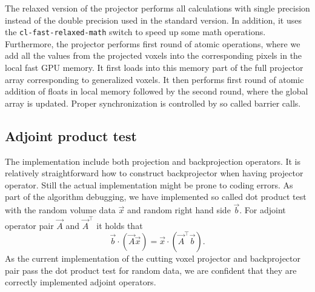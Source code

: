 The relaxed version of the projector performs all calculations with single precision instead of the double precision used in the standard version. In addition, it uses the \texttt{cl-fast-relaxed-math} switch to speed up some math operations. Furthermore, the projector performs first round of atomic operations, where we add all the values from the projected voxels into the corresponding pixels in the local fast GPU memory. It first loads into this memory part of the full projector array corresponding to generalized voxels. It then performs first round of atomic addition of floats in local memory followed by the second round, where the global  array is updated. Proper synchronization is controlled by so called barrier calls.

\subsection{Adjoint product test}
The implementation include both projection and backprojection operators. It is relatively straightforward how to construct backprojector when having projector operator. Still the actual implementation might be prone to coding errors. As part of the algorithm debugging, we have implemented so called dot product test with the random volume data $\vec{x}$ and random right hand side $\vec{b}$. For adjoint operator pair $\vec{A}$ and $\vec{A}^\top$ it holds that
\begin{equation}
    \vec{b} \cdot (\vec{A} \vec{x}) =  \vec{x} \cdot (\vec{A}^\top \vec{b}).
\end{equation}
As the current implementation of the cutting voxel projector and backprojector pair pass the dot product test for random data, we are confident that they are correctly implemented adjoint operators.

